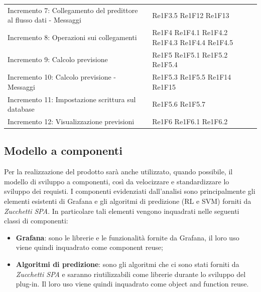 \begin{longtable}{C{4cm} L{3cm}}
\\
Incremento 7: Collegamento del predittore al flusso dati - Messaggi & Re1F3.5 \newline Re1F12 \newline Re1F13
\\
Incremento 8: Operazioni sui collegamenti & Re1F4 \newline Re1F4.1 \newline Re1F4.2 \newline Re1F4.3 \newline Re1F4.4 \newline Re1F4.5
\\
Incremento 9: Calcolo previsione & Re1F5 \newline Re1F5.1 \newline Re1F5.2 \newline Re1F5.4
\\
Incremento 10: Calcolo previsione - Messaggi & Re1F5.3 \newline Re1F5.5 \newline Re1F14 \newline Re1F15
\\
Incremento 11: Impostazione scrittura sul database & Re1F5.6 \newline Re1F5.7
\\
Incremento 12: Visualizzazione previsioni & Re1F6 \newline Re1F6.1 \newline Re1F6.2
\end{longtable}

\subsection{Modello a componenti}
Per la realizzazione del prodotto sarà anche utilizzato, quando possibile, il modello di sviluppo a componenti, così da velocizzare e standardizzare lo
sviluppo dei requisti. I componenti evidenziati dall’analisi sono principalmente
gli elementi esistenti di Grafana e gli algoritmi di predizione (RL e SVM) forniti
da \textit{Zucchetti SPA}. In particolare tali elementi vengono inquadrati nelle seguenti classi di componenti: \begin{itemize}
\item \textbf{Grafana}: sono le librerie e le funzionalità fornite da Grafana, il loro uso viene quindi inquadrato come component reuse;
\item \textbf{Algoritmi di predizione}: sono gli algoritmi che ci sono stati forniti da \textit{Zucchetti SPA} e saranno riutilizzabili come librerie durante lo sviluppo del plug-in. Il loro uso viene quindi inquadrato come object and
function reuse.
\end{itemize}